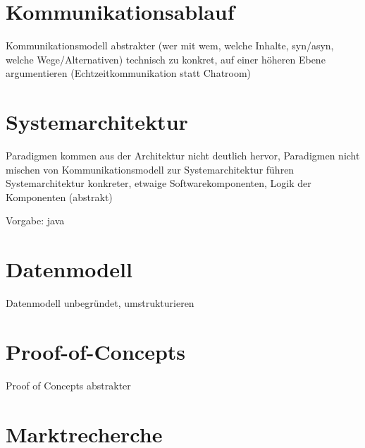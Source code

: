 \documentclass[12pt]{scrartcl}
\begin{document}

\section{Kommunikationsablauf}

Kommunikationsmodell abstrakter (wer mit wem, welche Inhalte, syn/asyn, welche Wege/Alternativen)
technisch zu konkret, auf einer höheren Ebene argumentieren (Echtzeitkommunikation statt Chatroom)




\section{Systemarchitektur}

Paradigmen kommen aus der Architektur nicht deutlich hervor, Paradigmen nicht mischen
von Kommunikationsmodell zur Systemarchitektur führen
Systemarchitektur konkreter, etwaige Softwarekomponenten, Logik der Komponenten (abstrakt)

Vorgabe: java


\section{Datenmodell}

Datenmodell unbegründet, umstrukturieren


\section{Proof-of-Concepts}

Proof of Concepts abstrakter


\section{Marktrecherche}

\end{document}
